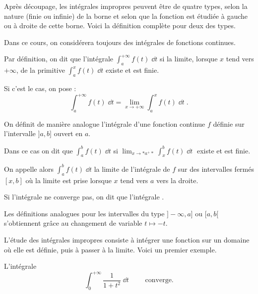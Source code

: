  \diapo

Après découpage, les intégrales impropres peuvent être de quatre types, 
selon la nature (finie ou infinie) de la borne
et selon que la fonction est étudiée à gauche ou à droite de cette borne. 
Voici la définition complète pour deux des types.

\change

Dans ce cours, on considérera toujours des intégrales de fonctions continues.

\change
Par définition, on dit que l'intégrale $\int_a^{+\infty} f(t)\;\dd t$  si
la limite, lorsque $x$ tend vers $+\infty$, de la primitive 
$\int_a^{x} f(t)\;\dd t$ existe et est finie. 

\change

Si c'est le cas, on pose :
\begin{equation}
\int_a^{+\infty} f(t)\;\dd t = \lim_{x\rightarrow+\infty} 
\int_a^x f(t)\;\dd t\;. 
\end{equation}

\change

On définit de manière analogue l'intégrale d'une fonction continue 
$f$ définie sur l'intervalle $]a,b]$ ouvert en $a$.

\change
Dans ce cas on dit que $\int_a^b f(t)\;\dd t$  si
 $\lim_{x\rightarrow *a^+*}  \int_x^b f(t)\;\dd t\;$ existe et est finie.
 
\change 
 
On appelle alors $\int_a^{b} f(t)\;\dd t $
la  limite de l'intégrale de $f$ sur des intervalles fermés $[x,b]$ où la limite  
est prise lorsque $x$ tend vers $a$ vers la droite.

\change

Si l'intégrale ne converge pas, on dit que l'intégrale .

Les définitions analogues pour les intervalles du type 
$]-\infty,a]$ ou $[a,b[$ s'obtiennent grâce au changement 
de variable $t\mapsto -t$.


\diapo

L'étude des intégrales impropres 
consiste à intégrer une fonction sur un domaine où elle est définie, 
puis à passer à la limite. Voici un premier exemple.

L'intégrale
$$
\int_0^{+\infty} \frac{1}{1+t^2}\;\dd t\qquad \text{ converge.}
$$

\change


